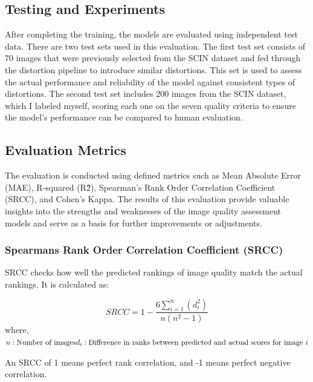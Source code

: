 \subsection{Testing and Experiments}
\label{sub:TestExperiment}
After completing the training, the models are evaluated using independent test data. There are two test sets used in this evaluation. The first test set consists of 70 images that were previously selected from the SCIN dataset and fed through the distortion pipeline to introduce similar distortions. This set is used to assess the actual performance and reliability of the model against consistent types of distortions. The second test set includes 200 images from the SCIN dataset, which I labeled myself, scoring each one on the seven quality criteria to ensure the model’s performance can be compared to human evaluation. \par 

\subsection{Evaluation Metrics}
\label{sub:EvaluationMetrics}
The evaluation is conducted using defined metrics such as Mean Absolute Error (MAE), R-squared (R\^2), Spearman’s Rank Order Correlation Coefficient (SRCC), and Cohen’s Kappa. The results of this evaluation provide valuable insights into the strengths and weaknesses of the image quality assessment models and serve as a basis for further improvements or adjustments. \par {}
\subsubsection{Spearmans Rank Order Correlation Coefficient (SRCC)}
\label{subsub:SRCC}
SRCC checks how well the predicted rankings of image quality match the actual rankings. It is calculated as: \par
\begin{equation}
    SRCC = 1 - \frac{6 \sum_{i=1}^n (d_i^2)}{n(n^2 - 1)}
\end{equation}
\noindent
where, \newline
$n: \text{Number of images} \\ d_i: \text{Difference in ranks between predicted and actual scores for image } i$ \par
\vspace{\baselineskip}
\noindent
An SRCC of 1 means perfect rank correlation, and -1 means perfect negative correlation. \par
